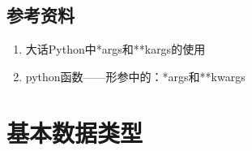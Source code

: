 \documentclass[letterpaper,10pt,english]{sphinxmanual}
\begin{document}
\subsection{参考资料}
\label{\detokenize{python/07_arg:id1}}\begin{enumerate}
\item {} 
大话Python中*args和**kargs的使用

\end{enumerate}
\begin{quote}

\end{quote}
\begin{enumerate}
\setcounter{enumi}{1}
\item {} 
python函数——形参中的：*args和**kwargs

\end{enumerate}
\begin{quote}

\end{quote}


\section{基本数据类型}
\label{\detokenize{python/08_basicType::doc}}\label{\detokenize{python/08_basicType:id1}}
\end{document}

